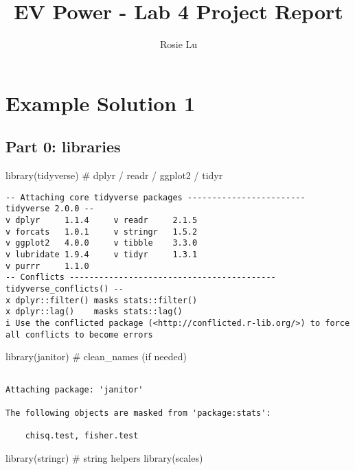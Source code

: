 \documentclass[
  english,
  letterpaper,
  DIV=11,
  numbers=noendperiod]{scrartcl}
\title{EV Power - Lab 4 Project Report}
\author{Rosie Lu}
\date{}
\newenvironment{Shaded}{\begin{snugshade}}{\end{snugshade}}
\newcommand{\CommentTok}[1]{\textcolor[rgb]{0.37,0.37,0.37}{#1}}
\newcommand{\FunctionTok}[1]{\textcolor[rgb]{0.28,0.35,0.67}{#1}}
\newcommand{\NormalTok}[1]{\textcolor[rgb]{0.00,0.23,0.31}{#1}}
\begin{document}
\maketitle


\section{Example Solution 1}\label{example-solution-1}

\subsection{\texorpdfstring{\textbf{Part 0:
libraries}}{Part 0: libraries}}\label{part-0-libraries}

\begin{Shaded}
\begin{Highlighting}[]
\FunctionTok{library}\NormalTok{(tidyverse)  }\CommentTok{\# dplyr / readr / ggplot2 / tidyr}
\end{Highlighting}
\end{Shaded}

\begin{verbatim}
-- Attaching core tidyverse packages ------------------------ tidyverse 2.0.0 --
v dplyr     1.1.4     v readr     2.1.5
v forcats   1.0.1     v stringr   1.5.2
v ggplot2   4.0.0     v tibble    3.3.0
v lubridate 1.9.4     v tidyr     1.3.1
v purrr     1.1.0     
-- Conflicts ------------------------------------------ tidyverse_conflicts() --
x dplyr::filter() masks stats::filter()
x dplyr::lag()    masks stats::lag()
i Use the conflicted package (<http://conflicted.r-lib.org/>) to force all conflicts to become errors
\end{verbatim}

\begin{Shaded}
\begin{Highlighting}[]
\FunctionTok{library}\NormalTok{(janitor)    }\CommentTok{\# clean\_names (if needed)}
\end{Highlighting}
\end{Shaded}

\begin{verbatim}

Attaching package: 'janitor'

The following objects are masked from 'package:stats':

    chisq.test, fisher.test
\end{verbatim}

\begin{Shaded}
\begin{Highlighting}[]
\FunctionTok{library}\NormalTok{(stringr)    }\CommentTok{\# string helpers}
\FunctionTok{library}\NormalTok{(scales)}
\end{Highlighting}
\end{Shaded}
\end{document}
